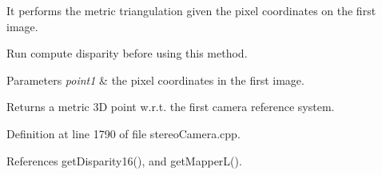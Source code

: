 It performs the metric triangulation given the pixel coordinates on the first image. 

Run compute disparity before using this method. 
\begin{DoxyParams}{Parameters}
{\em point1} & the pixel coordinates in the first image. \\
\hline
\end{DoxyParams}
\begin{DoxyReturn}{Returns}
a metric 3\+D point w.\+r.\+t. the first camera reference system. 
\end{DoxyReturn}


Definition at line 1790 of file stereo\+Camera.\+cpp.



References get\+Disparity16(), and get\+Mapper\+L().


